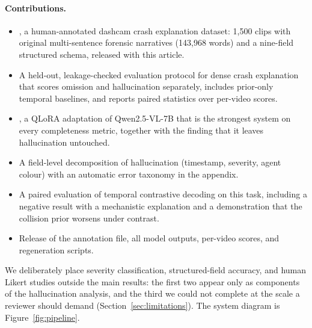 \paragraph{Contributions.}
\begin{itemize}
  \item \dataset{}, a human-annotated dashcam crash explanation dataset: 1{,}500 clips with original multi-sentence forensic narratives (143{,}968 words) and a nine-field structured schema, released with this article.
  \item A held-out, leakage-checked evaluation protocol for dense crash explanation that scores omission and hallucination separately, includes prior-only temporal baselines, and reports paired statistics over per-video scores.
  \item \crashlogic{}, a QLoRA adaptation of Qwen2.5-VL-7B that is the strongest system on every completeness metric, together with the finding that it leaves hallucination untouched.
  \item A field-level decomposition of hallucination (timestamp, severity, agent colour) with an automatic error taxonomy in the appendix.
  \item A paired evaluation of temporal contrastive decoding on this task, including a negative result with a mechanistic explanation and a demonstration that the collision prior worsens under contrast.
  \item Release of the annotation file, all model outputs, per-video scores, and regeneration scripts.
\end{itemize}

We deliberately place severity classification, structured-field accuracy, and human Likert studies outside the main results: the first two appear only as components of the hallucination analysis, and the third we could not complete at the scale a reviewer should demand (Section~\ref{sec:limitations}).
The system diagram is Figure~\ref{fig:pipeline}.
